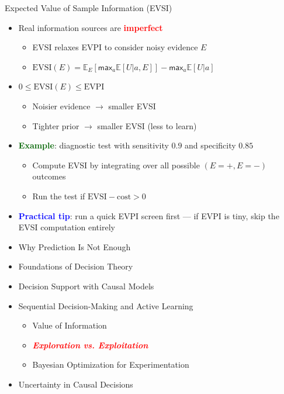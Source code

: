 \documentclass[
  10pt,
  ignorenonframetext,
]{beamer}
\providecommand{\tightlist}{%
  \setlength{\itemsep}{0pt}\setlength{\parskip}{0pt}}
\newcommand{\EE}{\mathbb{E}}
\def\max{\textsf{max}}
\begin{document}
\begin{frame}{Expected Value of Sample Information (EVSI)}
\label{expected-value-of-sample-information-evsi}
\begin{itemize}
\tightlist
\item
  Real information sources are \textbf{\textcolor{red}{imperfect}}

  \begin{itemize}
  \tightlist
  \item
    EVSI relaxes EVPI to consider noisy evidence \(E\)
  \item
    \(\text{EVSI}(E) = \EE_E[\max_a \EE[U | a, E]] - \max_a \EE[U | a]\)
  \end{itemize}
\item
  \(0 \leq \text{EVSI}(E) \leq \text{EVPI}\)

  \begin{itemize}
  \tightlist
  \item
    Noisier evidence \(\to\) smaller EVSI
  \item
    Tighter prior \(\to\) smaller EVSI (less to learn)
  \end{itemize}
\item
  \textbf{\textcolor{darkgreen}{Example}}: diagnostic test with
  sensitivity \(0.9\) and specificity \(0.85\)

  \begin{itemize}
  \tightlist
  \item
    Compute EVSI by integrating over all possible \((E = +, E = -)\)
    outcomes
  \item
    Run the test if \(\text{EVSI} - \text{cost} > 0\)
  \end{itemize}
\item
  \textbf{\textcolor{blue}{Practical tip}}: run a quick EVPI screen
  first --- if EVPI is tiny, skip the EVSI computation entirely
\end{itemize}
\end{frame}

\begin{frame}{}
\label{section-14}
\begin{itemize}
\tightlist
\item
  Why Prediction Is Not Enough
\item
  Foundations of Decision Theory
\item
  Decision Support with Causal Models
\item
  Sequential Decision-Making and Active Learning

  \begin{itemize}
  \tightlist
  \item
    Value of Information
  \item
    \emph{\textbf{\textcolor{red}{Exploration vs. Exploitation}}}
  \item
    Bayesian Optimization for Experimentation
  \end{itemize}
\item
  Uncertainty in Causal Decisions
\end{itemize}
\end{frame}
\end{document}
